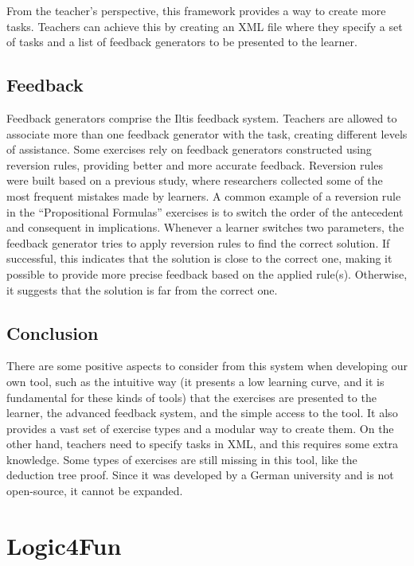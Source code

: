 From the teacher’s perspective, this framework provides a way to create more tasks. Teachers can achieve this by creating an XML file where they specify a set of tasks and a list of feedback generators to be presented to the learner.

\subsection{Feedback}
\label{chap:iltis-feedback}
Feedback generators comprise the Iltis feedback system. Teachers are allowed to associate more than one feedback generator with the task, creating different levels of assistance. Some exercises rely on feedback generators constructed using reversion rules, providing better and more accurate feedback. Reversion rules were built based on a previous study, where researchers collected some of the most frequent mistakes made by learners. A common example of a reversion rule in the “Propositional Formulas” exercises is to switch the order of the antecedent and consequent in implications. Whenever a learner switches two parameters, the feedback generator tries to apply reversion rules to find the correct solution. If successful, this indicates that the solution is close to the correct one, making it possible to provide more precise feedback based on the applied rule(s). Otherwise, it suggests that the solution is far from the correct one.

\subsection{Conclusion}
There are some positive aspects to consider from this system when developing our own tool, such as the intuitive way (it presents a low learning curve, and it is fundamental for these kinds of tools) that the exercises are presented to the learner, the advanced feedback system, and the simple access to the tool. It also provides a vast set of exercise types and a modular way to create them. On the other hand, teachers need to specify tasks in XML, and this requires some extra knowledge. Some types of exercises are still missing in this tool, like the deduction tree proof. Since it was developed by a German university and is not open-source, it cannot be expanded.

\section{Logic4Fun}


